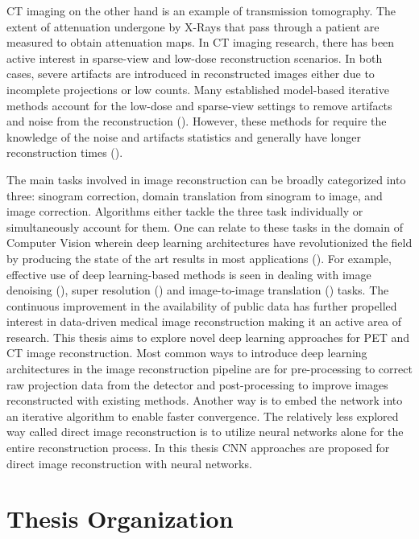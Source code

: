 \ac{CT} imaging on the other hand is an example of transmission tomography. The extent of attenuation undergone by X-Rays that pass through a patient are measured to obtain attenuation maps. In \ac{CT} imaging research, there has been active interest in sparse-view and low-dose reconstruction scenarios. In both cases, severe artifacts are introduced in  reconstructed images either due to incomplete projections or low counts. Many established model-based iterative methods account for the low-dose and sparse-view settings to remove artifacts and noise from the reconstruction (\cite{nuyts1998iterative,Elbakri2002,liu2013total}). However, these methods for require the knowledge of the noise and artifacts statistics and generally have longer reconstruction times (\cite{kim2014combining}). 


The main tasks involved in image reconstruction can be broadly categorized into three: sinogram correction, domain translation from sinogram to image, and image correction. Algorithms either tackle the three task individually or simultaneously account for them. One can relate to these tasks in the domain of Computer Vision wherein deep learning architectures have revolutionized the field by producing the state of the art results in most applications (\cite{guo2016deep}). For example, effective use of deep learning-based methods is seen in dealing with image denoising (\cite{kadimesetty2018convolutional,li2020sacnn,chen2017low,yang2018low}), super resolution (\cite{ledig2017photo,lim2017enhanced}) and image-to-image translation (\cite{isola2017image,zhu2017unpaired}) tasks. The continuous improvement in the availability of public data has further propelled interest in data-driven medical image reconstruction making it an active area of research. This thesis aims to explore novel deep learning approaches for \ac{PET} and \ac{CT} image reconstruction. Most common ways to introduce deep learning architectures in the image reconstruction pipeline are for pre-processing to correct raw projection data from the detector and post-processing to improve images reconstructed with existing methods. Another way is to embed the network into an iterative algorithm to enable faster convergence. The relatively less explored way called direct image reconstruction is to utilize neural networks alone for the entire reconstruction process. In this thesis \ac{CNN} approaches are proposed for direct image reconstruction with neural networks. 


\section{Thesis Organization}

